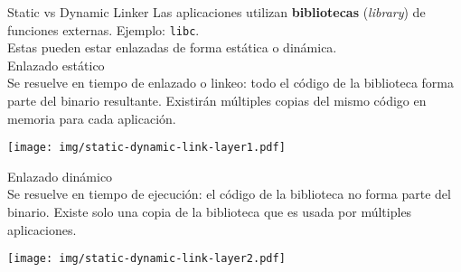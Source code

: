 \documentclass[aspectratio=169]{beamer}
\begin{document}
\begin{frame}[fragile,t]{Static vs Dynamic Linker}
    Las aplicaciones utilizan \textbf{bibliotecas} (\emph{library}) de funciones externas. Ejemplo: \texttt{libc}.\\
    Estas pueden estar enlazadas de forma estática o dinámica.\\
    \pause
    \vspace{0.2cm}
    \textcolor{naranjauca}{Enlazado estático}\\
    Se resuelve en tiempo de enlazado o linkeo: todo el código de la biblioteca forma parte del binario resultante.
    Existirán múltiples copias del mismo código en memoria para cada aplicación.
    \begin{center}
    \texttt{[image: img/static-dynamic-link-layer1.pdf]}
    \end{center}
    \pause
    \textcolor{naranjauca}{Enlazado dinámico}\\
    Se resuelve en tiempo de ejecución: el código de la biblioteca no forma parte del binario.
    Existe solo una copia de la biblioteca que es usada por múltiples aplicaciones.
    \begin{center}
    \texttt{[image: img/static-dynamic-link-layer2.pdf]}
    \end{center}
    
\end{frame}

\end{document}
